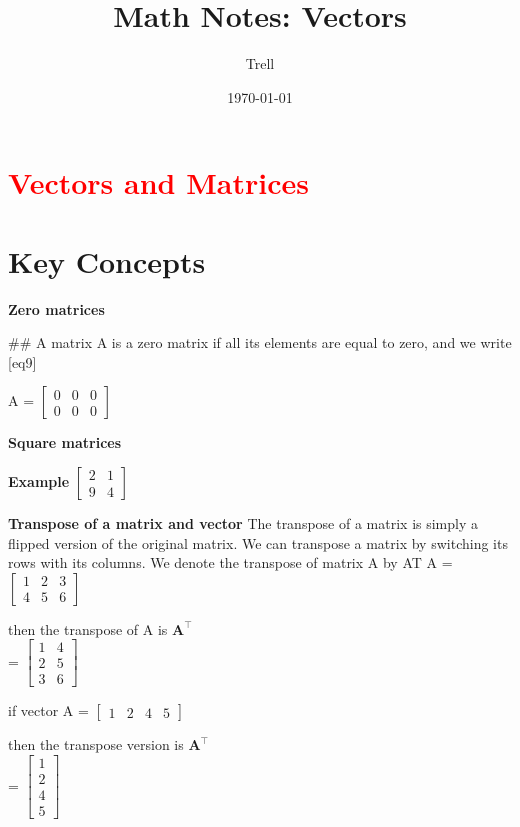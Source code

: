 \documentclass{article}
\title{Math Notes: Vectors}
\author{Trell}
\date{\today}
\begin{document}
\section*{\textcolor{red}{Vectors and Matrices}}

\hspace{1.5cm}

\section{Key Concepts}
\textbf {Zero matrices}

## A matrix A is a zero matrix if all its elements are equal to zero, and we write [eq9] 

A = $\begin{bmatrix}
 0 & 0 & 0 \\
 0 & 0 & 0
\end{bmatrix}$


\textbf {Square matrices}

\textbf {Example}
$\begin{bmatrix}
  2 & 1 \\
  9 & 4
\end{bmatrix}$

\textbf {Transpose of a matrix and vector}
The transpose of a matrix is simply a flipped version of the original matrix. We can transpose a matrix by switching its rows with its columns. We denote the transpose of matrix A by AT
A = $\begin{bmatrix}
  1 & 2 & 3 \\
  4 & 5 & 6
\end{bmatrix}$

then the transpose of A is 
$\mathbf{A}^\intercal$\\ = $\begin{bmatrix}
  1 & 4 \\
  2 & 5 \\
  3 & 6
\end{bmatrix}$

if vector A = $\begin{bmatrix}
  1 & 2 & 4 & 5
\end{bmatrix}$

then the transpose version is $\mathbf{A}^\intercal$\\ =  $\begin{bmatrix}
  1 \\
  2 \\
  4 \\ 
  5
\end{bmatrix}$
\end{document}
